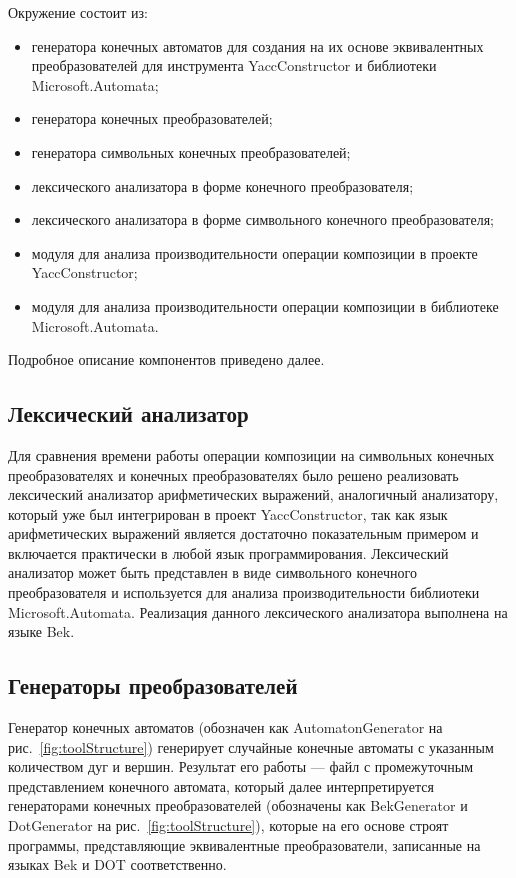 Окружение состоит из:
\begin{itemize}
\item генератора конечных автоматов для создания на их основе эквивалентных преобразователей для инструмента YaccConstructor и библиотеки Microsoft.Automata;
\item генератора конечных преобразователей;
\item генератора символьных конечных преобразователей;
\item лексического анализатора в форме конечного преобразователя;
\item лексического анализатора в форме символьного конечного преобразователя;
\item модуля для анализа производительности операции композиции в проекте YaccConstructor;
\item модуля для анализа производительности операции композиции в библиотеке Microsoft.Automata.
\end{itemize}
Подробное описание компонентов приведено далее.

\subsection{Лексический анализатор}
Для сравнения времени работы операции композиции на символьных конечных преобразователях и конечных преобразователях было решено реализовать лексический анализатор арифметических выражений, аналогичный анализатору, который уже был интегрирован в проект YaccConstructor, так как язык арифметических выражений является достаточно показательным примером и включается практически в любой язык программирования.  Лексический анализатор может быть представлен в виде символьного конечного преобразователя и используется для анализа производительности библиотеки Microsoft.Automata. Реализация данного лексического анализатора выполнена на языке Bek.

\subsection{Генераторы преобразователей}
Генератор конечных автоматов (обозначен как AutomatonGenerator на рис.~\ref{fig:toolStructure}) генерирует случайные конечные автоматы с указанным количеством дуг и вершин. Результат его работы --- файл с промежуточным представлением конечного автомата, который далее интерпретируется генераторами конечных преобразователей (обозначены как BekGenerator и DotGenerator на рис.~\ref{fig:toolStructure}), которые на его основе строят программы, представляющие эквивалентные преобразователи, записанные на языках Bek и DOT соответственно. 

